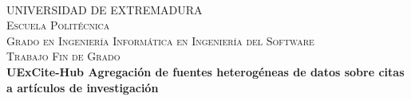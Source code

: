 \begin{titlepage}
  \begin{adjustwidth}{-1.5cm}{0cm}

    \vspace{-3.5em}
    \hspace{-0.5em}
    \begin{minipage}{0.45\textwidth}
      \begin{flushleft}
        
      \end{flushleft}
    \end{minipage}

    \vspace{-6em}
    \hspace{20em}
    \begin{minipage}{0.45\textwidth}
      \begin{flushright}
        
      \end{flushright}
    \end{minipage}\\[1.5cm]

    \begin{center}
      \textsc{\LARGE UNIVERSIDAD DE EXTREMADURA}\\[4cm]

      \textsc{\Large Escuela Politécnica}\\[0.5cm]
      \textsc{\Large Grado en Ingeniería Informática en Ingeniería del Software}\\[3cm]
      \textsc{\Large Trabajo Fin de Grado}\\[0.5cm]
      {\large \bfseries UExCite-Hub Agregación de fuentes heterogéneas de datos sobre citas a artículos de investigación}\\[4.0cm]
      \vfill

      {\large}
    \end{center}
  \end{adjustwidth}
\end{titlepage}

\pagestyle{empty}

